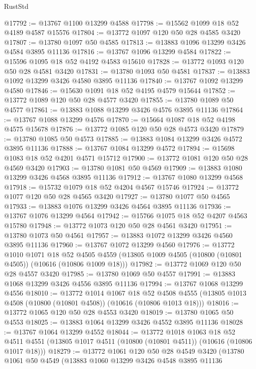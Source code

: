 \begin{lexlean}{RustStd}
\begin{coremodule}
@17792 := @13767 @1100 @13299 @4588
@17798 := @15562 @1099 @18 @52 @4189 @4587 @15576
@17804 := @13772 @1097 @120 @50 @28 @4585 @3420
@17807 := @13780 @1097 @50 @4585
@17813 := @13883 @1096 @13299 @3426 @4584 @3895 @11136
@17816 := @13767 @1096 @13299 @4584
@17822 := @15596 @1095 @18 @52 @4192 @4583 @15610
@17828 := @13772 @1093 @120 @50 @28 @4581 @3420
@17831 := @13780 @1093 @50 @4581
@17837 := @13883 @1092 @13299 @3426 @4580 @3895 @11136
@17840 := @13767 @1092 @13299 @4580
@17846 := @15630 @1091 @18 @52 @4195 @4579 @15644
@17852 := @13772 @1089 @120 @50 @28 @4577 @3420
@17855 := @13780 @1089 @50 @4577
@17861 := @13883 @1088 @13299 @3426 @4576 @3895 @11136
@17864 := @13767 @1088 @13299 @4576
@17870 := @15664 @1087 @18 @52 @4198 @4575 @15678
@17876 := @13772 @1085 @120 @50 @28 @4573 @3420
@17879 := @13780 @1085 @50 @4573
@17885 := @13883 @1084 @13299 @3426 @4572 @3895 @11136
@17888 := @13767 @1084 @13299 @4572
@17894 := @15698 @1083 @18 @52 @4201 @4571 @15712
@17900 := @13772 @1081 @120 @50 @28 @4569 @3420
@17903 := @13780 @1081 @50 @4569
@17909 := @13883 @1080 @13299 @3426 @4568 @3895 @11136
@17912 := @13767 @1080 @13299 @4568
@17918 := @15732 @1079 @18 @52 @4204 @4567 @15746
@17924 := @13772 @1077 @120 @50 @28 @4565 @3420
@17927 := @13780 @1077 @50 @4565
@17933 := @13883 @1076 @13299 @3426 @4564 @3895 @11136
@17936 := @13767 @1076 @13299 @4564
@17942 := @15766 @1075 @18 @52 @4207 @4563 @15780
@17948 := @13772 @1073 @120 @50 @28 @4561 @3420
@17951 := @13780 @1073 @50 @4561
@17957 := @13883 @1072 @13299 @3426 @4560 @3895 @11136
@17960 := @13767 @1072 @13299 @4560
@17976 := @13772
    @1010
    @1071
    @18
    @52
    @4505
    @4559
    (@13805 @1009 @4505 (@10800 (@10801 @4505)) (@10616 (@10806 @1009 @18)))
@17982 := @13772 @1069 @120 @50 @28 @4557 @3420
@17985 := @13780 @1069 @50 @4557
@17991 := @13883 @1068 @13299 @3426 @4556 @3895 @11136
@17994 := @13767 @1068 @13299 @4556
@18010 := @13772
    @1014
    @1067
    @18
    @52
    @4508
    @4555
    (@13805 @1013 @4508 (@10800 (@10801 @4508)) (@10616 (@10806 @1013 @18)))
@18016 := @13772 @1065 @120 @50 @28 @4553 @3420
@18019 := @13780 @1065 @50 @4553
@18025 := @13883 @1064 @13299 @3426 @4552 @3895 @11136
@18028 := @13767 @1064 @13299 @4552
@18044 := @13772
    @1018
    @1063
    @18
    @52
    @4511
    @4551
    (@13805 @1017 @4511 (@10800 (@10801 @4511)) (@10616 (@10806 @1017 @18)))
@18279 := @13772
    @1061
    @120
    @50
    @28
    @4549
    @3420
    (@13780
      @1061
      @50
      @4549
      (@13883
        @1060
        @13299
        @3426
        @4548
        @3895
        @11136

\end{coremodule}
\end{lexlean}

